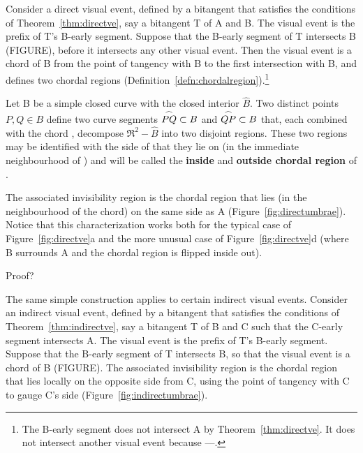 \documentclass[12pt]{article}
\begin{document}
Consider a direct visual event, defined by a bitangent that satisfies
the conditions of Theorem~\ref{thm:directve}, say a bitangent T of A and B.
The visual event is the prefix of T's B-early segment. %
Suppose that the B-early segment of T intersects B (FIGURE),
before it intersects any other visual event. %
Then the visual event is a chord of B from the point of tangency with B
to the first intersection with B,
and defines two chordal regions (Definition~\ref{defn:chordalregion}).\footnote{The 
  B-early segment does not intersect A by Theorem~\ref{thm:directve}.
  It does not intersect another visual event because ---.}

\begin{defn2}
\label{defn:chordalregion}
Let B be a simple closed curve with the closed interior $\hat{B}$.
Two distinct points $P,Q \in B$
define two curve segments $\mbox{$\stackrel{\frown}{PQ}$} \subset B$ and $\mbox{$\stackrel{\frown}{QP}$} \subset B$
that, each combined with the chord , 
decompose $\Re^2 - \hat{B}$ into two disjoint regions.
These two regions may be identified with the side of  that they lie on
(in the immediate neighbourhood of )
and will be called the {\bf inside} and {\bf outside chordal region} of .
\end{defn2}


The associated invisibility region is the chordal region 
that lies (in the neighbourhood of the chord) 
on the same side as A (Figure~\ref{fig:directumbrae}).
Notice that this characterization works both for the typical case of
Figure~\ref{fig:directve}a and the more unusual case of Figure~\ref{fig:directve}d
(where B surrounds A and the chordal region is flipped inside out).

Proof?

The same simple construction applies to certain indirect visual events.
Consider an indirect visual event, defined by a bitangent that satisfies
the conditions of Theorem~\ref{thm:indirectve},
say a bitangent T of B and C such that the C-early segment intersects A.
The visual event is the prefix of T's B-early segment.
Suppose that the B-early segment of T intersects B,
so that the visual event is a chord of B (FIGURE).
The associated invisibility region is the chordal region 
that lies locally on the opposite side from C, using the point of tangency with C to
gauge C's side (Figure~\ref{fig:indirectumbrae}).
\end{document}
